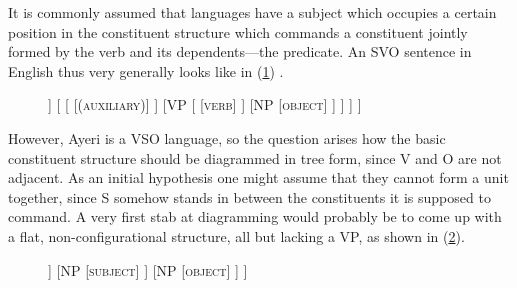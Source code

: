 










It is commonly assumed that languages have a subject which occupies a certain
position in the constituent structure which commands a constituent jointly
formed by the verb and its dependents---the predicate. An SVO sentence in
English thus very generally looks like in (\ref{ex:basicsvo})
\parencite[compare the examples in][101--111]{bresnan2016}.

\begin{figure}
\ex\label{ex:basicsvo}
\begin{forest}
[IP
	[NP
		[\textsc{subject}]
	]
	[
		[
			[\textsc{(auxiliary)}]
		]
		[VP
				[
					[\textsc{verb}]
				]
				[NP
					[\textsc{object}]
				]
		]
	]
]
\end{forest}
\xe
\end{figure}

However, Ayeri is a VSO language, so the question arises how the basic
constituent structure should be diagrammed in tree form, since V and O are not
adjacent. As an initial hypothesis one might assume that they cannot form a
unit together, since S somehow stands in between the constituents it is
supposed to command. A very first stab at diagramming would probably be to come
up with a flat, non-configurational structure, all but lacking a VP, as shown
in (\ref{ex:ayrtreefirsthypo}).

\begin{figure}[h]
\ex\label{ex:ayrtreefirsthypo}\ljudge\ques
\begin{forest}
[S
	[V
		[\textsc{verb}]
	]
	[NP
		[\textsc{subject}]
	]
	[NP
		[\textsc{object}]
	]
]
\end{forest}
\xe
\end{figure}

